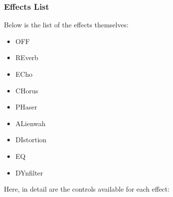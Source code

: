 \subsubsection{Effects List}
\label{subsubsec:command_line_effects_list}
   Below is the list of the effects themselves:
   \begin{itemize}
      \item OFF
      \item REverb
      \item ECho
      \item CHorus
      \item PHaser
      \item ALienwah
      \item DIstortion
      \item EQ
      \item DYnfilter
   \end{itemize}

   Here, in detail are the controls available for each effect:

